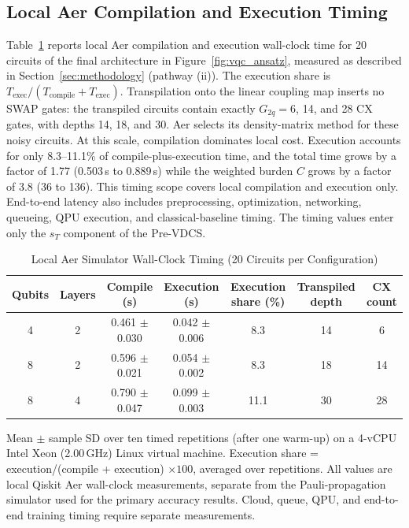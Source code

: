 \documentclass[final,5p,times,number]{elsarticle}
\begin{document}
\subsection{Local Aer Compilation and Execution Timing}
\label{sec:latency}

Table~\ref{tab:latency} reports local Aer compilation and execution wall-clock time for 20 circuits of the final architecture in Figure~\ref{fig:vqc_ansatz}, measured as described in Section~\ref{sec:methodology} (pathway (ii)). The execution share is $T_{\mathrm{exec}}/(T_{\mathrm{compile}}+T_{\mathrm{exec}})$. Transpilation onto the linear coupling map inserts no SWAP gates: the transpiled circuits contain exactly $G_{2q}=6$, 14, and 28 CX gates, with depths 14, 18, and 30. Aer selects its density-matrix method for these noisy circuits. At this scale, compilation dominates local cost. Execution accounts for only 8.3--11.1\% of compile-plus-execution time, and the total time grows by a factor of 1.77 (0.503\,s to 0.889\,s) while the weighted burden $C$ grows by a factor of 3.8 (36 to 136). This timing scope covers local compilation and execution only. End-to-end latency also includes preprocessing, optimization, networking, queueing, QPU execution, and classical-baseline timing. The timing values enter only the $s_T$ component of the Pre-VDCS.

\begin{table}[!t]
  \centering
  \caption{Local Aer Simulator Wall-Clock Timing (20 Circuits per Configuration)}
  \label{tab:latency}
  \small
  \setlength{\tabcolsep}{3pt}
    \begin{tabular}{ccccccc}
      \toprule
      \textbf{Qubits} & \textbf{Layers} & \textbf{Compile (s)} & \textbf{Execution (s)} & \textbf{Execution share (\%)} & \textbf{Transpiled depth} & \textbf{CX count} \\
      \midrule
      4 & 2 & 0.461 $\pm$ 0.030 & 0.042 $\pm$ 0.006 & 8.3 & 14 & 6 \\
      8 & 2 & 0.596 $\pm$ 0.021 & 0.054 $\pm$ 0.002 & 8.3 & 18 & 14 \\
      8 & 4 & 0.790 $\pm$ 0.047 & 0.099 $\pm$ 0.003 & 11.1 & 30 & 28 \\
      \bottomrule
    \end{tabular}
  \begin{tablenotes}
    \small
  \item Mean $\pm$ sample SD over ten timed repetitions (after one warm-up) on a 4-vCPU Intel Xeon (2.00\,GHz) Linux virtual machine. Execution share = execution/(compile + execution) $\times 100$, averaged over repetitions. All values are local Qiskit Aer wall-clock measurements, separate from the Pauli-propagation simulator used for the primary accuracy results. Cloud, queue, QPU, and end-to-end training timing require separate measurements.
  \end{tablenotes}
\end{table}
\end{document}

